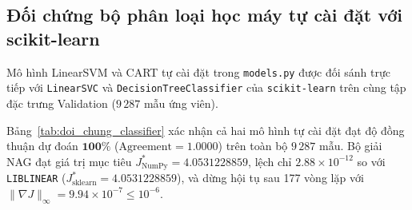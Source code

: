 \subsection{Đối chứng bộ phân loại học máy tự cài đặt với scikit-learn}

Mô hình LinearSVM và CART tự cài đặt trong \texttt{models.py} được đối sánh trực tiếp với \texttt{LinearSVC} và \texttt{DecisionTreeClassifier} của \texttt{scikit-learn} trên cùng tập đặc trưng Validation ($9\,287$ mẫu ứng viên).

\begin{table}[!htbp]
\centering
\small
\caption{Đối chứng hiệu năng, độ đồng thuận dự đoán và giá trị mục tiêu giữa mô hình tự cài đặt bằng NumPy và thư viện \texttt{scikit-learn}.}
\label{tab:doi_chung_classifier}
\end{table}

Bảng~\ref{tab:doi_chung_classifier} xác nhận cả hai mô hình tự cài đặt đạt độ đồng thuận dự đoán $\mathbf{100\%}$ ($\text{Agreement} = 1.0000$) trên toàn bộ $9\,287$ mẫu. Bộ giải NAG đạt giá trị mục tiêu $J_{\text{NumPy}}^* = 4.0531228859$, lệch chỉ $2.88 \times 10^{-12}$ so với \texttt{LIBLINEAR} ($J_{\text{sklearn}}^* = 4.0531228859$), và dừng hội tụ sau 177 vòng lặp với $\|\nabla J\|_\infty = 9.94 \times 10^{-7} \le 10^{-6}$.
